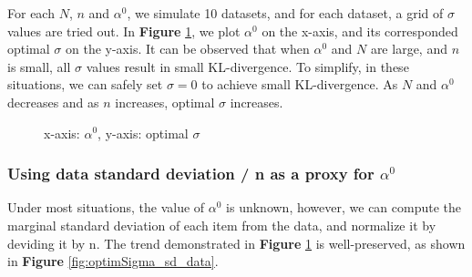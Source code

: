 \documentclass[11pt, oneside]{article}   	%
\begin{document}
For each $N$, $n$ and $\alpha^0$, we simulate 10 datasets, and for each dataset, a grid of $\sigma$ values are tried out. In \textbf{Figure }\ref{fig:optimSigma}, we plot $\alpha^0$ on the x-axis, and its corresponded optimal $\sigma$ on the y-axis. It can be observed that when $\alpha^0$ and $N$ are large, and $n$ is small, all $\sigma$ values result in small KL-divergence. To simplify, in these situations, we can safely set $\sigma = 0$ to achieve small KL-divergence. As $N$ and $\alpha^0$ decreases and as $n$ increases, optimal $\sigma$ increases.
\begin{figure}[h!]
		\caption{x-axis: $\alpha^0$, y-axis: optimal $\sigma$}
		\label{fig:optimSigma}
\end{figure}

\subsubsection{Using data standard deviation / n as a proxy for $\alpha^0$}
Under most situations, the value of $\alpha^0$ is unknown, however, we can compute the marginal standard deviation of each item from the data, and normalize it by deviding it by n. The trend demonstrated in \textbf{Figure }\ref{fig:optimSigma} is well-preserved, as shown in \textbf{Figure }\ref{fig:optimSigma_sd_data}.
\end{document}
